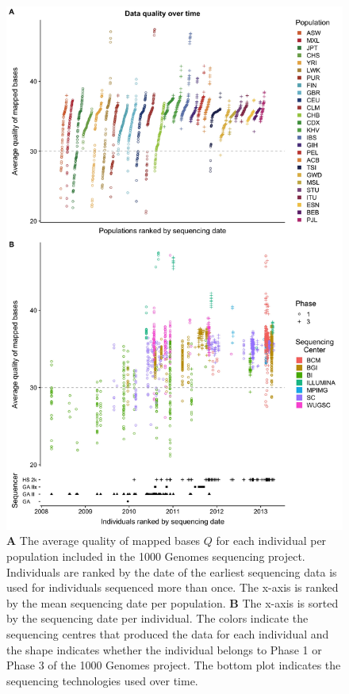 \documentclass[
11pt, %
oneside, %
english, %
doublespacing, %
headsepline, %
chapterinoneline, %
]{MastersDoctoralThesis} %
\begin{document}
\begin{figure}
\begin{center}
\includegraphics[width=0.75\hsize,keepaspectratio]{./Figures/MapQualOverTime.jpg}

\caption{\textbf{A} The average quality of mapped bases $Q$ for each individual per population included in the 1000 Genomes sequencing project. Individuals are ranked by the date of the earliest sequencing data is used for individuals sequenced more than once. The x-axis is ranked by the mean sequencing date per population. \textbf{B} The x-axis is sorted by the sequencing date per individual. The colors indicate the sequencing centres that produced the data for each individual and the shape indicates whether the individual belongs to Phase 1 or Phase 3 of the 1000 Genomes project. The bottom plot indicates the sequencing technologies used over time.}
\label{MapQual}
\end{center}
\end{figure}
\end{document}
